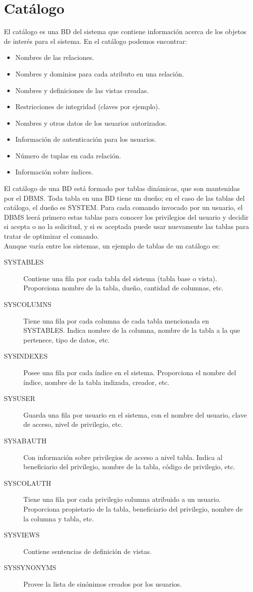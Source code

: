 \documentclass[a4paper]{article}
\begin{document}
\section{Cat\'alogo}
El cat\'alogo es una BD del sistema que contiene informaci\'on acerca de los objetos
de inter\'es para el sistema. En el cat\'alogo podemos encontrar:
\begin{itemize}
    \item Nombres de las relaciones.
    \item Nombres y dominios para cada atributo en una relaci\'on.
    \item Nombres y definiciones de las vistas creadas.
    \item Restricciones de integridad (claves por ejemplo).
    \item Nombres y otros datos de los usuarios autorizados.
    \item Informaci\'on de autenticaci\'on para los usuarios.
    \item N\'umero de tuplas en cada relaci\'on.
    \item Informaci\'on sobre \'indices.
\end{itemize}
El cat\'alogo de una BD est\'a formado por tablas din\'amicas, que son mantenidas
por el DBMS. Toda tabla en una BD tiene un dueño; en el caso de las tablas del
cat\'alogo, el dueño es SYSTEM. Para cada comando invocado por un usuario, el DBMS
leer\'a primero estas tablas para conocer los privilegios del usuario y decidir
si acepta o no la solicitud, y si es aceptada puede usar nuevamente las tablas
para tratar de optimizar el comando. \\
Aunque var\'ia entre los sistemas, un ejemplo de tablas de un cat\'alogo es:
\begin{description}
    \item[SYSTABLES] Contiene una fila por cada tabla del sistema (tabla base o
    vista). Proporciona nombre de la tabla, dueño, cantidad de columnas, etc.
    \item[SYSCOLUMNS] Tiene una fila por cada columna de cada tabla mencionada
    en SYSTABLES. Indica nombre de la columna, nombre de la tabla a la que
    pertenece, tipo de datos, etc.
    \item[SYSINDEXES] Posee una fila por cada \'indice en el sistema. Proporciona
    el nombre del \'indice, nombre de la tabla indizada, creador, etc.
    \item[SYSUSER] Guarda una fila por usuario en el sistema, con el nombre del
    usuario, clave de acceso, nivel de privilegio, etc.
    \item[SYSABAUTH] Con informaci\'on sobre privilegios de acceso a nivel tabla.
    Indica al beneficiario del privilegio, nombre de la tabla, c\'odigo de
    privilegio, etc.
    \item[SYSCOLAUTH] Tiene una fila por cada privilegio columna atribuido a un
    usuario. Proporciona propietario de la tabla, beneficiario del privilegio,
    nombre de la columna y tabla, etc.
    \item[SYSVIEWS] Contiene sentencias de definici\'on de vistas.
    \item[SYSSYNONYMS] Provee la lista de sin\'onimos creados por los usuarios.
\end{description}
\end{document}
